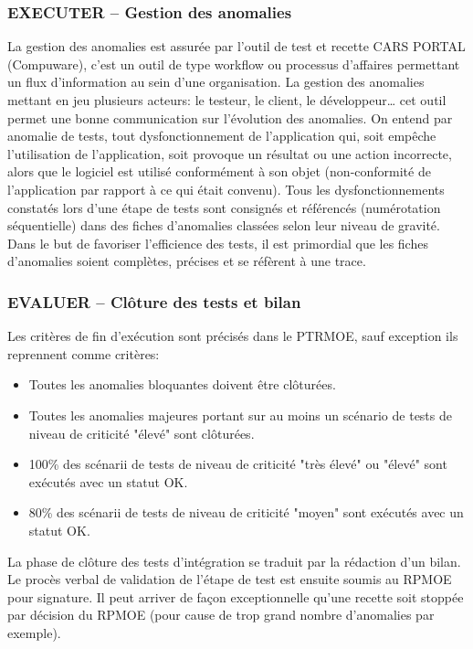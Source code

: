 \subsubsection*{EXECUTER – Gestion des anomalies}
La gestion des anomalies est assurée par l’outil de test et recette CARS PORTAL (Compuware), c’est un outil de type workflow ou processus d’affaires permettant un flux d’information au sein d’une organisation. La gestion des anomalies mettant en jeu plusieurs acteurs: le testeur, le client, le développeur… cet outil permet une bonne communication sur l’évolution des anomalies.
On entend par anomalie de tests, tout dysfonctionnement de l’application qui, soit empêche l’utilisation de l’application, soit provoque un résultat ou une action incorrecte, alors que le logiciel est utilisé conformément à son objet (non-conformité de l’application par rapport à ce qui était convenu).
Tous les dysfonctionnements constatés lors d’une étape de tests sont consignés et référencés (numérotation séquentielle) dans des fiches d’anomalies classées selon leur niveau de gravité. Dans le but de favoriser l’efficience des tests, il est primordial que les fiches d’anomalies soient complètes, précises et se réfèrent à une trace.

\subsubsection*{EVALUER – Clôture des tests et bilan}
Les critères de fin d’exécution sont précisés dans le PTRMOE, sauf exception ils reprennent comme critères:
\begin{itemize}
\item Toutes les anomalies bloquantes doivent être clôturées.
\item Toutes les anomalies majeures portant sur au moins un scénario de tests de niveau de criticité "élevé" sont clôturées.
\item 100\% des scénarii de tests de niveau de criticité "très élevé" ou "élevé" sont exécutés avec un statut OK.
\item 80\% des scénarii de tests de niveau de criticité "moyen" sont exécutés avec un statut OK.
\end{itemize}

La phase de clôture des tests d’intégration se traduit par la rédaction d’un bilan. Le procès verbal de validation de l’étape de test est ensuite soumis au RPMOE pour signature.
Il peut arriver de façon exceptionnelle qu’une recette soit stoppée par décision du RPMOE (pour cause de trop grand nombre d’anomalies par exemple).

